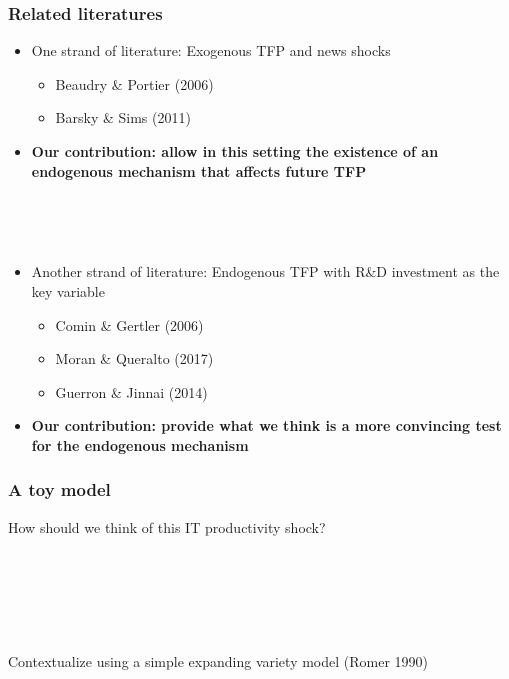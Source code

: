 \documentclass{beamer}
\begin{document}
\begin{frame}
	\frametitle{Related literatures}
	\label{related_lit}
\begin{itemize}
\item One strand of literature: Exogenous TFP and news shocks
	\begin{itemize}
	\item Beaudry \& Portier (2006)
	\item Barsky \& Sims (2011)
	
	\end{itemize}
\item [] \textbf{Our contribution: allow in this setting the existence of an endogenous mechanism that affects future TFP}	

	\
	
	\
	
\item Another strand of literature: Endogenous TFP with R\&D investment as the key variable
	\begin{itemize}
	\item Comin \& Gertler (2006)
	\item Moran \& Queralto (2017)
	\item Guerron \& Jinnai (2014)
	
	\end{itemize}	


\item []  \textbf{Our contribution: provide what we think is a more convincing test for the endogenous mechanism}


\end{itemize}



\end{frame}

\begin{frame}
	\frametitle{A toy model}
	
	How should we think of this IT productivity shock?
	
	\
	
	\
	
	\
	
	Contextualize using a simple expanding variety model (Romer 1990)
	

\end{frame}
\end{document}
